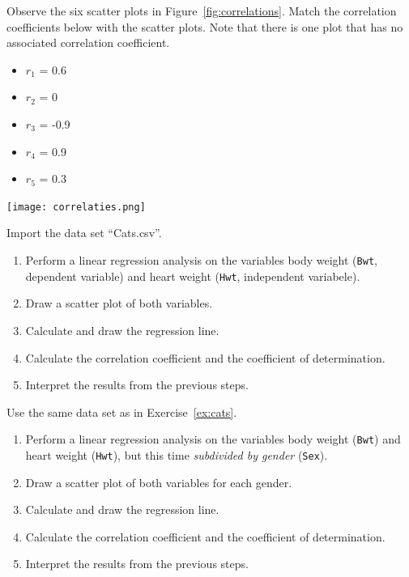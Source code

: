 \begin{exercise}
  \label{ex:scatter-correlation-coefficient}
  Observe the six scatter plots in Figure~\ref{fig:correlations}. Match the correlation coefficients below with the scatter plots. Note that there is one plot that has no associated correlation coefficient.
  \begin{itemize}
    \item $r_{1}$ = 0.6
    \item $r_{2}$ = 0
    \item $r_{3}$ = -0.9
    \item $r_{4}$ = 0.9
    \item $r_{5}$ = 0.3
  \end{itemize}
  \texttt{[image: correlaties.png]}
  \label{fig:correlations}
\end{exercise}

\begin{exercise}
  \label{ex:cats}
  Import the data set ``Cats.csv''.
  \begin{enumerate}
    \item Perform a linear regression analysis on the variables body weight (\texttt{Bwt}, dependent variable) and heart weight (\texttt{Hwt}, independent variabele).
    \item Draw a scatter plot of both variables.
    \item Calculate and draw the regression line.
    \item Calculate the correlation coefficient and the coefficient of determination.
    \item Interpret the results from the previous steps.
  \end{enumerate}
\end{exercise}

\begin{exercise}
  \label{ex:cats-sex}
  Use the same data set as in Exercise~\ref{ex:cats}.
  \begin{enumerate}
    \item Perform a linear regression analysis on the variables body weight (\texttt{Bwt}) and heart weight (\texttt{Hwt}), but this time \emph{subdivided by gender} (\texttt{Sex}).
    \item Draw a scatter plot of both variables for each gender.
    \item Calculate and draw the regression line.
    \item Calculate the correlation coefficient and the coefficient of determination.
    \item Interpret the results from the previous steps.
  \end{enumerate}
\end{exercise}

